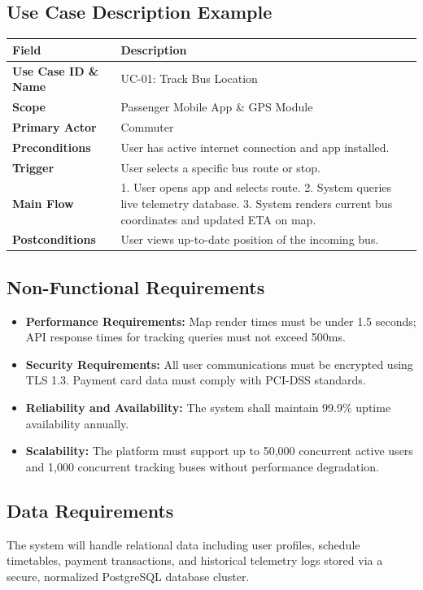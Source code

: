 \documentclass[11pt, a4paper]{article}
\begin{document}
\subsection{Use Case Description Example}
\begin{table}[h]
\centering
\begin{tabular}{lp{10cm}}
\toprule
\textbf{Field} & \textbf{Description} \\ \midrule
\textbf{Use Case ID \& Name} & UC-01: Track Bus Location \\
\textbf{Scope} & Passenger Mobile App \& GPS Module \\
\textbf{Primary Actor} & Commuter \\
\textbf{Preconditions} & User has active internet connection and app installed. \\
\textbf{Trigger} & User selects a specific bus route or stop. \\
\textbf{Main Flow} & 1. User opens app and selects route. 2. System queries live telemetry database. 3. System renders current bus coordinates and updated ETA on map. \\
\textbf{Postconditions} & User views up-to-date position of the incoming bus. \\
\bottomrule
\end{tabular}
\end{table}

\subsection{Non-Functional Requirements}
\begin{itemize}[leftmargin=*]
    \item \textbf{Performance Requirements:} Map render times must be under 1.5 seconds; API response times for tracking queries must not exceed 500ms.
    \item \textbf{Security Requirements:} All user communications must be encrypted using TLS 1.3. Payment card data must comply with PCI-DSS standards.
    \item \textbf{Reliability and Availability:} The system shall maintain 99.9\% uptime availability annually.
    \item \textbf{Scalability:} The platform must support up to 50,000 concurrent active users and 1,000 concurrent tracking buses without performance degradation.
\end{itemize}

\subsection{Data Requirements}
The system will handle relational data including user profiles, schedule timetables, payment transactions, and historical telemetry logs stored via a secure, normalized PostgreSQL database cluster.
\end{document}
